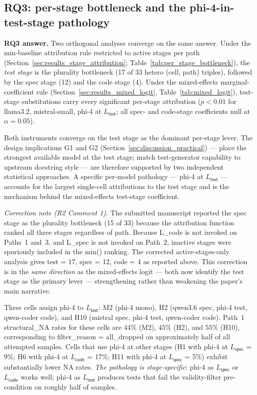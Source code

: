 \subsection{RQ3: per-stage bottleneck and the phi-4-in-test-stage pathology}
\label{sec:discussion_rq3}

\textbf{RQ3 answer.} Two orthogonal analyses converge on the same answer. Under the min-baseline attribution rule restricted to active stages per path (Section~\ref{sec:results_stage_attribution}; Table~\ref{tab:per_stage_bottleneck}), the \emph{test stage} is the plurality bottleneck (17 of 33 hetero (cell, path) triples), followed by the spec stage (12) and the code stage (4). Under the mixed-effects marginal-coefficient rule (Section~\ref{sec:results_mixed_logit}, Table~\ref{tab:mixed_logit}), test-stage substitutions carry every significant per-stage attribution ($p < 0.01$ for llama3.2, mistral-small, phi-4 at $L_{\textsf{test}}$; all spec- and code-stage coefficients null at $\alpha = 0.05$).

Both instruments converge on the test stage as the dominant per-stage lever. The design implications G1 and G2 (Section~\ref{sec:discussion_practical}) --- place the strongest available model at the test stage; match test-generator capability to upstream docstring style --- are therefore supported by two independent statistical approaches. A specific per-model pathology --- phi-4 at $L_{\textsf{test}}$ --- accounts for the largest single-cell attributions to the test stage and is the mechanism behind the mixed-effects test-stage coefficient.

\emph{Correction note (R2 Comment 1).} The submitted manuscript reported the spec stage as the plurality bottleneck (15 of 33) because the attribution function ranked all three stages regardless of path. Because L\_code is not invoked on Paths~1 and~3, and L\_spec is not invoked on Path~2, inactive stages were spuriously included in the min() ranking. The corrected active-stages-only analysis gives test = 17, spec = 12, code = 4 as reported above. This correction is in the \emph{same direction} as the mixed-effects logit --- both now identify the test stage as the primary lever --- strengthening rather than weakening the paper's main narrative.

Three cells assign phi-4 to $L_{\textsf{test}}$: M2 (phi-4 mono), H2 (qwen3.6 spec, phi-4 test, qwen-coder code), and H10 (mistral spec, phi-4 test, qwen-coder code). Path~1 \textsf{structural\_NA} rates for these cells are $44\%$ (M2), $45\%$ (H2), and $55\%$ (H10), corresponding to \textsf{filter\_reason} = \textsf{all\_dropped} on approximately half of all attempted samples. Cells that use phi-4 at other stages (H1 with phi-4 at $L_{\textsf{spec}}$ = 9\%; H6 with phi-4 at $L_{\textsf{code}}$ = 17\%; H11 with phi-4 at $L_{\textsf{spec}}$ = 5\%) exhibit substantially lower NA rates. \emph{The pathology is stage-specific}: phi-4 as $L_{\textsf{spec}}$ or $L_{\textsf{code}}$ works well; phi-4 as $L_{\textsf{test}}$ produces tests that fail the validity-filter pre-condition on roughly half of samples.


